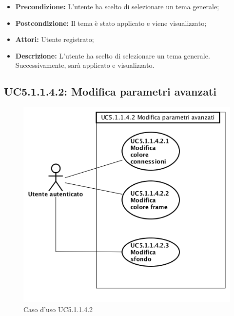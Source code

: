 \begin{itemize}
	\item \textbf{Precondizione:} L'utente ha scelto di selezionare un tema generale;
	\item \textbf{Postcondizione:} Il tema è stato applicato e viene visualizzato;
	\item \textbf{Attori:} Utente registrato;
	\item \textbf{Descrizione:} L'utente ha scelto di selezionare un tema generale. Successivamente, sarà applicato e visualizzato.
\end{itemize}
\subsection{ UC5.1.1.4.2: Modifica parametri avanzati}

\begin{figure}[h]
	\begin{center}
	\includegraphics[scale=0.4]{diagram/UC5-1-1-4-2.png}
	\caption{Caso d'uso UC5.1.1.4.2}
	\end{center}
\end{figure}
